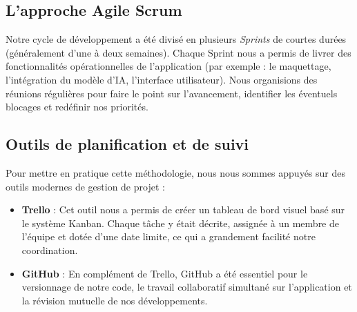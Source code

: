 \subsection{L'approche Agile Scrum}
Notre cycle de développement a été divisé en plusieurs \textit{Sprints} de courtes durées (généralement d'une à deux semaines). Chaque Sprint nous a permis de livrer des fonctionnalités opérationnelles de l'application (par exemple : le maquettage, l'intégration du modèle d'IA, l'interface utilisateur). Nous organisions des réunions régulières pour faire le point sur l'avancement, identifier les éventuels blocages et redéfinir nos priorités.

\subsection{Outils de planification et de suivi}
Pour mettre en pratique cette méthodologie, nous nous sommes appuyés sur des outils modernes de gestion de projet :
\begin{itemize}
    \item \textbf{Trello} : Cet outil nous a permis de créer un tableau de bord visuel basé sur le système Kanban. Chaque tâche y était décrite, assignée à un membre de l'équipe et dotée d'une date limite, ce qui a grandement facilité notre coordination.
    \item \textbf{GitHub} : En complément de Trello, GitHub a été essentiel pour le versionnage de notre code, le travail collaboratif simultané sur l'application et la révision mutuelle de nos développements.
\end{itemize}